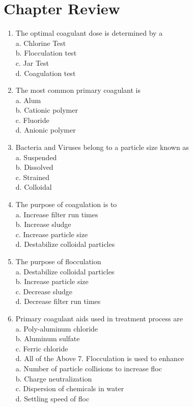 \documentclass[10pt]{article}
\begin{document}
\section{Chapter Review}
\begin{enumerate}
  \item The optimal coagulant dose is determined by a\\
a. Chlorine Test\\
b. Flocculation test\\
c. Jar Test\\
d. Coagulation test

  \item The most common primary coagulant is\\
a. Alum\\
b. Cationic polymer\\
c. Fluoride\\
d. Anionic polymer

  \item Bacteria and Viruses belong to a particle size known as\\
a. Suspended\\
b. Dissolved\\
c. Strained\\
d. Colloidal

  \item The purpose of coagulation is to\\
a. Increase filter run times\\
b. Increase sludge\\
c. Increase particle size\\
d. Destabilize colloidal particles

  \item The purpose of flocculation\\
a. Destabilize colloidal particles\\
b. Increase particle size\\
c. Decrease sludge\\
d. Decrease filter run times

  \item Primary coagulant aids used in treatment process are\\
a. Poly-aluminum chloride\\
b. Aluminum sulfate\\
c. Ferric chloride\\
d. All of the Above 7. Flocculation is used to enhance\\
a. Number of particle collisions to increase floc\\
b. Charge neutralization\\
c. Dispersion of chemicals in water\\
d. Settling speed of floc


\end{enumerate}
\end{document}

